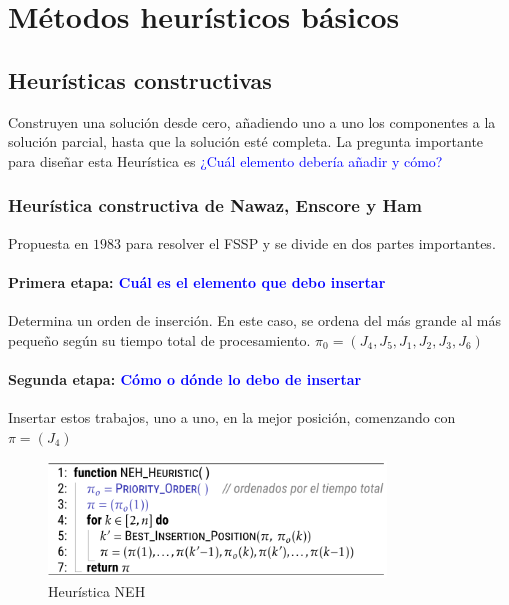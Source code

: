 \documentclass[10pt, a4paper]{article}
\begin{document}
\section{Métodos heurísticos básicos}\label{sec:basic-heuristic-methods}

\subsection{Heurísticas constructivas}\label{sec:constructive-heuristics}

Construyen una solución desde cero, añadiendo uno a uno los componentes a la 
solución parcial, hasta que la solución esté completa. La pregunta importante 
para diseñar esta Heurística es \textcolor{blue}{¿Cuál elemento 
debería añadir y cómo?}

\subsubsection{Heurística constructiva de Nawaz, Enscore y Ham}

Propuesta en $1983$ para resolver el FSSP y se divide en dos partes importantes.

\paragraph{Primera etapa: \textcolor{blue}{Cuál es el elemento que debo insertar}}

Determina un orden de inserción. En este caso, se ordena del más 
grande al más pequeño según su tiempo total de procesamiento.
$\pi_0 = (J_4, J_5, J_1, J_2, J_3, J_6)$

\paragraph{Segunda etapa: \textcolor{blue}{Cómo o dónde lo debo de insertar}}

Insertar estos trabajos, uno a uno, en la mejor posición, comenzando con 
$\pi = (J_4)$

\begin{figure}[H]
  \centering
  \includegraphics[width=0.8\textwidth]{./.github/1733245449.png}
  \caption{Heurística NEH}\label{fig:NEH-heuristic}
\end{figure}
\end{document}

